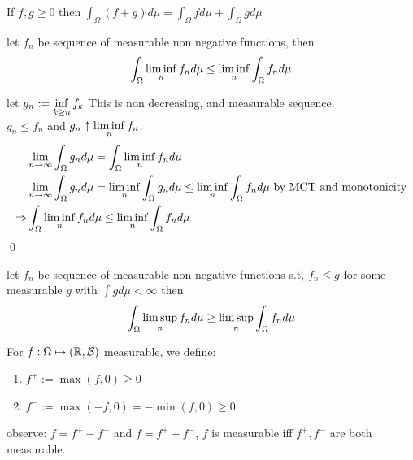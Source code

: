 \begin{ex}If $f, g\geq 0$ then $\int_\Omega (f+g) d\mu = \int_\Omega f d\mu+\int_\Omega g d\mu$
\end{ex}
\newpage
\begin{thm}\label{Fatou}
let $f_n$ be sequence of measurable non negative functions, then 
\begin{equation*}
    \int_{\Omega} \liminf\limits_{n} f_n d\mu \leq \liminf\limits_{n}\int_{\Omega} f_n d\mu
\end{equation*}
\end{thm}
\pf let $g_n := \inf\limits_{k\geq n}f_k$ This is non decreasing, and measurable sequence. \\
$g_n \leq f_n$ and $g_n \uparrow \liminf\limits_{n}f_n$.
\begin{align*}
    &\lim\limits_{n\rightarrow\infty}\int_{\Omega} g_n d\mu = \int_{\Omega} \liminf\limits_{n}f_n d\mu \\
    &\lim\limits_{n\rightarrow\infty}\int_{\Omega} g_n d\mu = \liminf\limits_{n}\int_{\Omega} g_n d\mu \leq \liminf\limits_{n}\int_{\Omega} f_n d\mu \text{ by MCT and monotonicity}\\
    \Rightarrow& \int_{\Omega} \liminf\limits_{n}f_n d\mu \leq \liminf\limits_{n}\int_{\Omega} f_n d\mu
\end{align*}
\qed
\begin{ex}
let $f_n$ be sequence of measurable non negative functions s.t, $f_n\leq g$ for some measurable $g$ with $\int g d\mu < \infty$ then 
\begin{equation*}
    \int_{\Omega} \limsup\limits_{n} f_n d\mu \geq \limsup\limits_{n}\int_{\Omega} f_n d\mu
\end{equation*}
\end{ex}
\newpage
\begin{dfn}
For $f: \Omega \mapsto (\bar{\mathbb{R}}, \bar{\mathcal{B}})$ measurable, we define:
\begin{enumerate}
    \item $f^+ :=\max(f, 0) \geq 0$
    \item $f^- :=\max(-f, 0) = -\min(f, 0) \geq 0$
\end{enumerate}
\end{dfn}
observe: $f = f^+ - f^-$ and $f = f^+ + f^-$, $f$ is measurable iff $f^+, f^-$ are both measurable.

